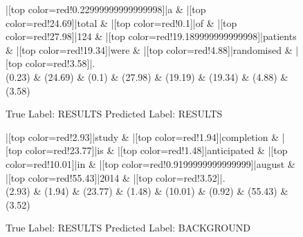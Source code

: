 \documentclass[a4paper, landscape]{article}
\begin{document}
\begin{figure}
\begin{center}
\begin{dependency}
\begin{deptext}
|[top color=red!0.22999999999999998]|a \& |[top color=red!24.69]|total \& |[top color=red!0.1]|of \& |[top color=red!27.98]|124 \& |[top color=red!19.189999999999998]|patients \& |[top color=red!19.34]|were \& |[top color=red!4.88]|randomised \& |[top color=red!3.58]|.\\
(0.23) \& (24.69) \& (0.1) \& (27.98) \& (19.19) \& (19.34) \& (4.88) \& (3.58)\\
\end{deptext}
\end{dependency}
\end{center}
\caption{True Label: RESULTS Predicted Label: RESULTS}
\end{figure}
\clearpage
\begin{figure}
\begin{center}
\begin{dependency}
\begin{deptext}
|[top color=red!2.93]|study \& |[top color=red!1.94]|completion \& |[top color=red!23.77]|is \& |[top color=red!1.48]|anticipated \& |[top color=red!10.01]|in \& |[top color=red!0.9199999999999999]|august \& |[top color=red!55.43]|2014 \& |[top color=red!3.52]|.\\
(2.93) \& (1.94) \& (23.77) \& (1.48) \& (10.01) \& (0.92) \& (55.43) \& (3.52)\\
\end{deptext}
\end{dependency}
\end{center}
\caption{True Label: RESULTS Predicted Label: BACKGROUND}
\end{figure}
\clearpage
\end{document}
